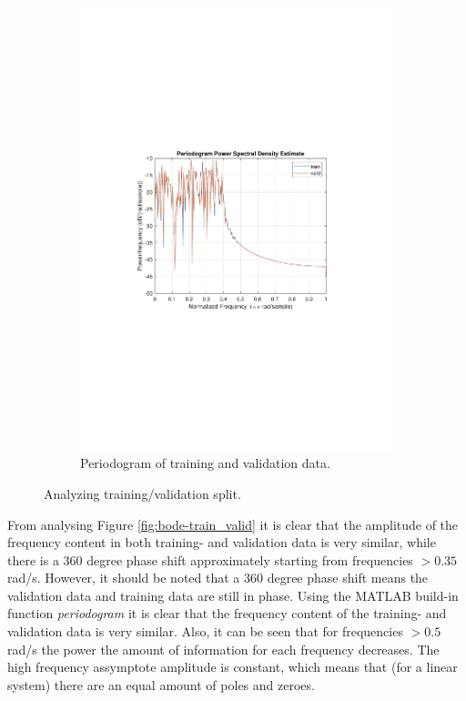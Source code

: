 \documentclass[]{article}
\begin{document}
\begin{figure}[ht]
\begin{subfigure}{.49\textwidth}
	\includegraphics[trim= 10cm 8cm 10cm 8cm, scale=0.4]{figures/periodogram-train_valid.pdf}
	\caption{Periodogram of training and validation data.}
	\label{fig:periodogram-train_valid}
\end{subfigure}
\caption{Analyzing training/validation split.}
\label{fig:train_valid}
\end{figure}

From analysing Figure \ref{fig:bode-train_valid} it is clear that the amplitude of the frequency content in both training- and validation data is very similar, while there is a 360 degree phase shift approximately starting from frequencies $>0.35$ rad/s. However, it should be noted that a 360 degree phase shift means the validation data and training data are still in phase. Using the MATLAB build-in function \emph{periodogram} it is clear that the frequency content of the training- and validation data is very similar. Also, it can be seen that for frequencies $> 0.5$ rad/s the power the amount of information for each frequency decreases. 
The high frequency assymptote amplitude is constant, which means that (for a linear system) there are an equal amount of poles and zeroes.
\end{document}
